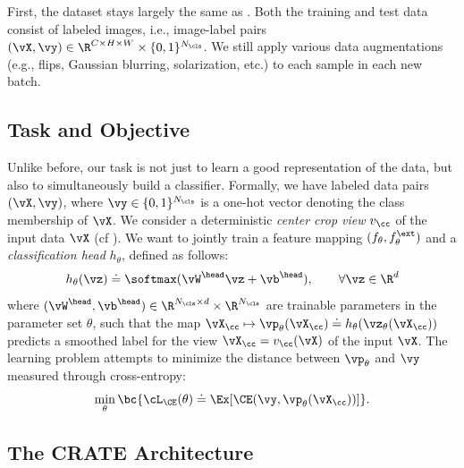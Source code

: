\documentclass[../../book-main.tex]{subfiles}
\begin{document}
First, the dataset stays largely the same as
. Both the training and test data
consist of labeled images, i.e., image-label pairs \((\vX, \vy) \in
\R^{C \times H \times W} \times \{0, 1\}^{N_{\cls}}\). We still apply
various data augmentations (e.g., flips, Gaussian blurring,
solarization, etc.) to each sample in each new batch.

\subsection{Task and Objective} \label{sub:image_classification_objective}

Unlike before, our task is not just to learn a good representation of
the data, but also to simultaneously build a classifier. Formally, we
have labeled data pairs \((\vX, \vy)\), where \(\vy \in \{0,
1\}^{N_{\cls}}\) is a one-hot vector denoting the class membership of
\(\vX\). We consider a deterministic \textit{center crop view}
\(v_{\cc}\) of the input data \(\vX\) (cf
). We want to jointly train
a feature mapping \((f_{\theta}, f_{\theta}^{\ext})\) and a
\textit{classification head} \(h_{\theta}\), defined as follows:
\begin{equation}
h_{\theta}(\vz) \doteq \softmax(\vW^{\head}\vz + \vb^{\head}), \qquad
\forall \vz \in \R^{d}
\end{equation}
where \((\vW^{\head}, \vb^{\head}) \in \R^{N_{\cls} \times d} \times
\R^{N_{\cls}}\) are trainable parameters in the parameter set
\(\theta\), such that the map \(\vX_{\cc} \mapsto
\vp_{\theta}(\vX_{\cc}) \doteq h_{\theta}(\vz_{\theta}(\vX_{\cc}))\)
predicts a smoothed label for the view \(\vX_{\cc} = v_{\cc}(\vX)\)
of the input \(\vX\). The learning problem attempts to minimize the
distance between \(\vp_{\theta}\) and \(\vy\) measured through cross-entropy:
\begin{equation}\label{eq:classification_ce_loss}
\min_{\theta}\bc{\cL_{\CE}(\theta) \doteq \Ex[\CE(\vy,
\vp_{\theta}(\vX_{\cc}))]}.
\end{equation}

\subsection{The CRATE Architecture}\label{sub:image_classification_architecture}
\end{document}
